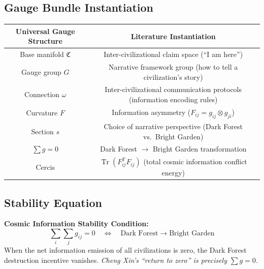 \documentclass[12pt,a4paper]{article}
\theoremstyle{plain}
\theoremstyle{definition}
\newcommand{\curv}{F}
\newcommand{\conn}{\omega}
\newcommand{\ClaimSpace}{\mathfrak{C}}
\DeclareMathOperator{\Tr}{Tr}
\begin{document}
\subsection{Gauge Bundle Instantiation}

\begin{center}
\begin{tabular}{c|c}
    \toprule
    \textbf{Universal Gauge Structure} & \textbf{Literature Instantiation} \\
    \midrule
    Base manifold $\ClaimSpace$ & Inter-civilizational claim space (``I am here'') \\
    Gauge group $G$ & Narrative framework group (how to tell a civilization's story) \\
    Connection $\conn$ & Inter-civilizational communication protocols (information encoding rules) \\
    Curvature $\curv$ & Information asymmetry ($F_{ij} = g_{ij} \otimes g_{ji}$) \\
    Section $s$ & Choice of narrative perspective (Dark Forest vs.\ Bright Garden) \\
    $\sum g = 0$ & Dark Forest $\to$ Bright Garden transformation \\
    Cercis & $\Tr(F_{ij}^T F_{ij})$ (total cosmic information conflict energy) \\
    \bottomrule
\end{tabular}
\end{center}

\subsection{Stability Equation}

\begin{keyeq}
\textbf{Cosmic Information Stability Condition:}
\begin{equation}
    \boxed{\sum_i \sum_j g_{ij} = 0 \quad \Longleftrightarrow \quad \text{Dark Forest} \to \text{Bright Garden}}
\end{equation}
When the net information emission of all civilizations is zero, the Dark Forest destruction incentive vanishes.
\textit{Cheng Xin's ``return to zero'' is precisely $\sum g = 0$.}
\end{keyeq}

\newpage

\end{document}

